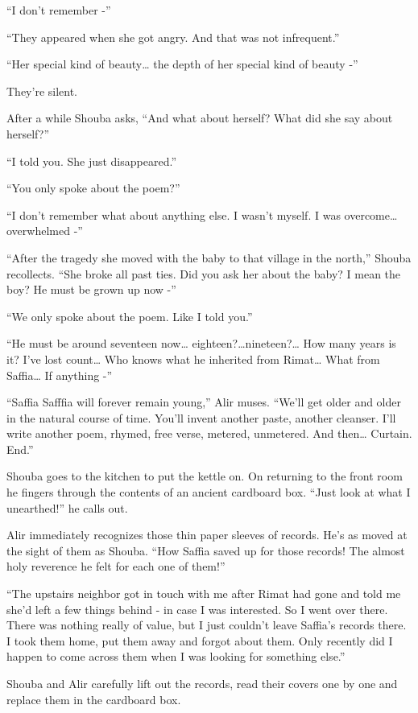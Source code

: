 \documentclass[twoside,11pt]{book}
\begin{document}
``I don't remember -''

``They appeared when she got angry. And that was not infrequent.''

``Her special kind of beauty{\dots} the depth of her special kind of beauty -''

They're silent.

After a while Shouba asks, ``And what about herself? What did she say about herself?''

``I told you. She just disappeared.''

``You only spoke about the poem?''

``I don't remember what about anything else. I wasn't myself. I was overcome{\ldots} overwhelmed
-''

``After the tragedy she moved with the baby to that village in the north,'' Shouba
recollects. ``She broke all past ties. Did you ask her about the baby? I mean the boy? He must be grown up
now -''

``We only spoke about the poem. Like I told you.''

``He must be around seventeen now{\dots} eighteen?{\dots}nineteen?{\dots} How many years is it? I've lost
count{\dots}  Who knows what he inherited from Rimat{\ldots} What from Saffia{\ldots} If anything -''

``Saffia Safffia will forever remain young,'' Alir muses. ``We'll get older and
older in the natural course of time. You'll invent another paste, another cleanser. I'll write another poem, rhymed,
free verse, metered, unmetered. And then{\dots} Curtain. End.''

Shouba goes to the kitchen to put the kettle on. On returning to the front room he fingers through the contents of an
ancient cardboard box. ``Just look at what I unearthed!'' he calls out.

Alir immediately recognizes those thin paper sleeves of records. He's as moved at the sight of them as Shouba.
``How Saffia saved up for those records! The almost holy reverence he felt for each one of
them!''

``The upstairs neighbor got in touch with me after Rimat had gone and told me she'd left a few things
behind - in case I was interested. So I went over there. There was nothing really of value, but I just couldn't leave
Saffia's records there. I took them home, put them away and forgot about them. Only recently did I happen to come
across them when I was looking for something else.''

Shouba and Alir carefully lift out the records, read their covers one by one and replace them in the cardboard box.
\end{document}
